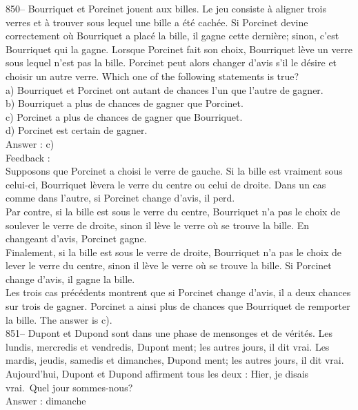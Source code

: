 ﻿\documentclass[letterpaper, 12pt]{article}
\begin{document}
850-- Bourriquet et Porcinet jouent aux billes.  Le jeu consiste \`a aligner
trois verres et \`a trouver sous lequel une bille a \'et\'e cach\'ee. Si
Porcinet devine correctement o\`u Bourriquet a plac\'e la bille, il gagne
cette derni\`ere; sinon, c'est Bourriquet qui la gagne.  Lorsque Porcinet
fait son choix, Bourriquet l\`eve un verre sous lequel n'est pas la bille.
Porcinet peut alors changer d'avis s'il le d\'esire et choisir un autre
verre.  Which one of the following statements is true?\\
a) Bourriquet et Porcinet ont autant de chances l'un que l'autre de
gagner.\\
b) Bourriquet a plus de chances de gagner que Porcinet.\\
c) Porcinet a plus de chances de gagner que Bourriquet.\\
d) Porcinet est certain de gagner.\\

Answer : c)\\

Feedback : \\
Supposons que Porcinet a choisi le verre de gauche. Si la bille est vraiment
sous celui-ci, Bourriquet l\`evera le verre du centre ou celui de droite.
Dans un cas comme dans l'autre, si Porcinet change d'avis, il perd.  \\
Par contre, si la bille est sous le verre du centre, Bourriquet n'a pas le
choix de soulever le verre de droite, sinon il l\`eve le verre o\`u se
trouve la bille.  En changeant d'avis, Porcinet gagne.\\
Finalement, si la bille est sous le verre de droite, Bourriquet n'a pas le
choix de lever le verre du centre, sinon il l\`eve le verre o\`u se trouve
la bille.  Si Porcinet change d'avis, il gagne la bille.\\
Les trois cas pr\'ec\'edents montrent que si Porcinet change d'avis, il a
deux chances sur trois de gagner.  Porcinet a ainsi plus de chances que
Bourriquet de remporter la bille.  The answer is c).\\

851-- Dupont et Dupond sont dans une phase de mensonges et de v\'erit\'es.
Les lundis, mercredis et vendredis, Dupont ment; les autres jours, il dit
vrai.  Les mardis, jeudis, samedis et dimanches, Dupond ment; les autres
jours, il dit vrai.  Aujourd'hui, Dupont et Dupond affirment tous les deux :
\og Hier, je disais vrai.\fg\  Quel jour sommes-nous?\\

Answer : dimanche\\
\end{document}
